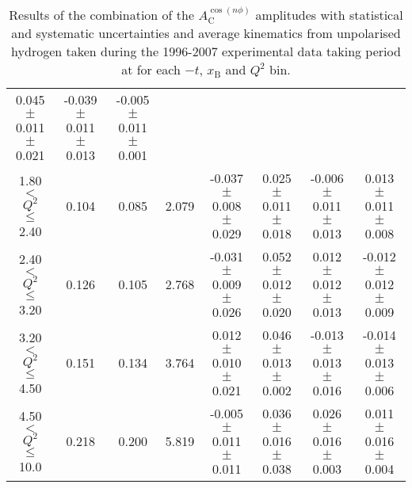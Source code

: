 {\begin{table}[width=15cm]
\begin{center}
{\begin{tabular}{|c|c|c|c|c|c|c|c|}
0.045  $\pm$  0.011  $\pm$   0.021 & -0.039  $\pm$  0.011  $\pm$  0.013 & -0.005  $\pm$  0.011   $\pm$  0.001\\
1.80 $<$ $Q^{2}$ $\leqslant$ 2.40 &  0.104 & 0.085 &  2.079 &  -0.037  $\pm$  0.008  $\pm$   0.029 &
 0.025  $\pm$  0.011  $\pm$   0.018 & -0.006 $\pm$   0.011  $\pm$  0.013 & 0.013  $\pm$   0.011  $\pm$  0.008\\
2.40 $<$ $Q^{2}$ $\leqslant$ 3.20 &  0.126 & 0.105  & 2.768 &  -0.031 $\pm$   0.009  $\pm$   0.026 &  
0.052  $\pm$  0.012  $\pm$   0.020 & 0.012  $\pm$  0.012  $\pm$  0.013 & -0.012  $\pm$  0.012  $\pm$  0.009\\
3.20 $<$ $Q^{2}$ $\leqslant$ 4.50 &  0.151 & 0.134 &  3.764 &  0.012  $\pm$  0.010   $\pm$  0.021 & 
0.046 $\pm$   0.013  $\pm$   0.002 & -0.013  $\pm$  0.013 $\pm$ 0.016 & -0.014   $\pm$  0.013  $\pm$  0.006\\
4.50 $<$ $Q^{2}$ $\leqslant$ 10.0 &  0.218 & 0.200 &  5.819 &  -0.005  $\pm$  0.011  $\pm$   0.011 & 
0.036  $\pm$  0.016  $\pm$  0.038 & 0.026 $\pm$   0.016  $\pm$  0.003 & 0.011   $\pm$  0.016   $\pm$   0.004\\
\hline
  \end{tabular}
}
 \end{center}
\caption{Results of the combination of the $A_{\textrm{C}}^{\cos(n\phi)}$  amplitudes with statistical and systematic uncertainties and average kinematics from unpolarised hydrogen taken during
the 1996-2007 experimental data taking period at  for each $-t$, $x_{\textrm{B}}$ and $Q^{2}$ bin.}
\end{table}
}
